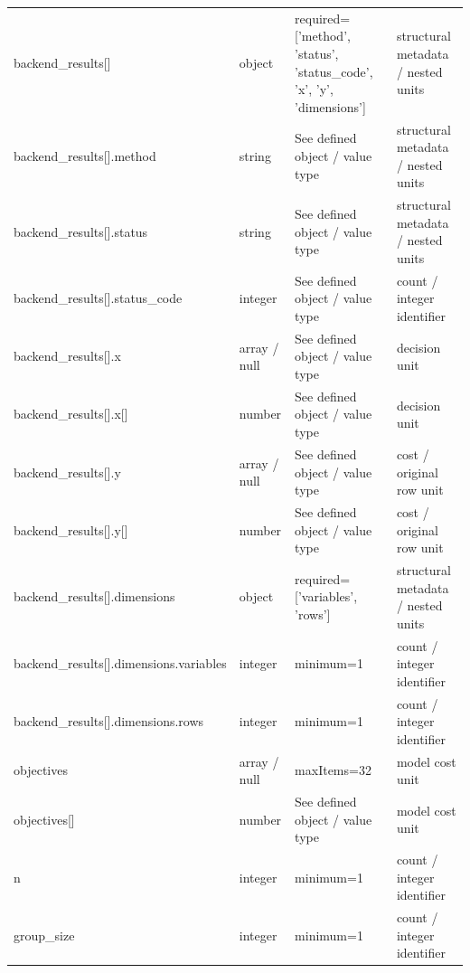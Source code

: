 \begin{longtable}{@{}>{\raggedright\arraybackslash}p{}>{\raggedright\arraybackslash}p{}>{\raggedright\arraybackslash}p{}>{\raggedright\arraybackslash}p{}@{}}
backend\_\allowbreak{}results[] & object & required=\allowbreak{}['method', 'status', 'status\_\allowbreak{}code', 'x', 'y', 'dimensions'] & structural metadata /\allowbreak{} nested units\\
backend\_\allowbreak{}results[].\allowbreak{}method & string & See defined object /\allowbreak{} value type & structural metadata /\allowbreak{} nested units\\
backend\_\allowbreak{}results[].\allowbreak{}status & string & See defined object /\allowbreak{} value type & structural metadata /\allowbreak{} nested units\\
backend\_\allowbreak{}results[].\allowbreak{}status\_\allowbreak{}code & integer & See defined object /\allowbreak{} value type & count /\allowbreak{} integer identifier\\
backend\_\allowbreak{}results[].\allowbreak{}x & array /\allowbreak{} null & See defined object /\allowbreak{} value type & decision unit\\
backend\_\allowbreak{}results[].\allowbreak{}x[] & number & See defined object /\allowbreak{} value type & decision unit\\
backend\_\allowbreak{}results[].\allowbreak{}y & array /\allowbreak{} null & See defined object /\allowbreak{} value type & cost /\allowbreak{} original row unit\\
backend\_\allowbreak{}results[].\allowbreak{}y[] & number & See defined object /\allowbreak{} value type & cost /\allowbreak{} original row unit\\
backend\_\allowbreak{}results[].\allowbreak{}dimensions & object & required=\allowbreak{}['variables', 'rows'] & structural metadata /\allowbreak{} nested units\\
backend\_\allowbreak{}results[].\allowbreak{}dimensions.\allowbreak{}variables & integer & minimum=\allowbreak{}1 & count /\allowbreak{} integer identifier\\
backend\_\allowbreak{}results[].\allowbreak{}dimensions.\allowbreak{}rows & integer & minimum=\allowbreak{}1 & count /\allowbreak{} integer identifier\\
objectives & array /\allowbreak{} null & maxItems=\allowbreak{}32 & model cost unit\\
objectives[] & number & See defined object /\allowbreak{} value type & model cost unit\\
n & integer & minimum=\allowbreak{}1 & count /\allowbreak{} integer identifier\\
group\_\allowbreak{}size & integer & minimum=\allowbreak{}1 & count /\allowbreak{} integer identifier\\

\end{longtable}
